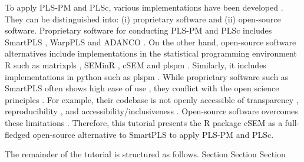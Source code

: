\documentclass[12pt,a4paper]{article}\usepackage[]{graphicx}\usepackage[]{xcolor}
\newcommand{\pkg}[1]{\textsf{#1}}
\begin{document}
To apply PLS-PM and PLSc, various implementations have been developed \citep{Venturini2023}.
They can be distinguished into: (i) proprietary software and (ii) open-source software.
Proprietary software %
for conducting PLS-PM and PLSc includes SmartPLS \citep{Ringle2024}, WarpPLS \citep{Kock2025} and ADANCO \citep{adanco}.
On the other hand, open-source software alternatives include implementations in the statistical programming environment R \citep{R} such as matrixpls \citep{Roenkkoe2022a}, SEMinR \citep{seminr}, cSEM \citep{csem} and plspm \citep{Sanchez2025}.
Similarly, it includes implementations in python \citep{python3} such as plspm \citep{Humble2024}.
While proprietary software such as SmartPLS often shows high ease of use \citep{Cheah2024}, they conflict with the open science principles \citep{UNESCO}.
For example, their codebase is not openly accessible of transparency \citep{Morin2012a}, reproducibility \citep{Ince2012}, and accessibility/inclusiveness \citep{}.
Open-source software overcomes these limitations \citep{Barba2022}.
Therefore, this tutorial presents the R package cSEM as a full-fledged open-source alternative to SmartPLS to apply PLS-PM and PLSc.



\citet{Barba2022}

\citep{Chuah2021}

The remainder of the tutorial is structured as follows.
Section
Section
Section


\end{document}
